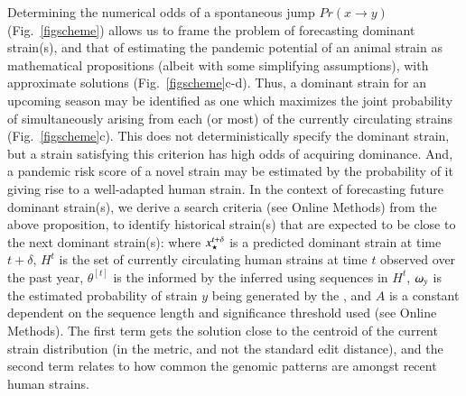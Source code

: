 \documentclass[onecolumn, compsoc,10pt]{IEEEtran}
\def\METHODS{Online Methods\xspace}
\begin{document}
Determining the numerical odds of a spontaneous jump $ Pr(x \rightarrow y)$ (Fig.~\ref{figscheme}) allows us to frame the problem of forecasting  dominant strain(s), and that of estimating the  pandemic potential of an animal strain as  mathematical propositions (albeit with some simplifying assumptions), with  approximate solutions (Fig.~\ref{figscheme}c-d). Thus,  a dominant strain for an upcoming  season may be identified as one which maximizes the joint probability of simultaneously arising from each (or most)  of the currently circulating strains (Fig.~\ref{figscheme}c).  This does not deterministically specify the dominant strain, but a strain satisfying this criterion  has  high odds of acquiring dominance. And, a pandemic risk score of a novel strain may be estimated by the probability of it giving rise to a well-adapted human strain. In the context of  forecasting  future dominant strain(s),  we derive a search criteria (see \METHODS) from the above proposition, to identify  historical strain(s) that are  expected to be close to the next dominant strain(s):
%
%
where $x_\star^{t+\delta}$ is a predicted dominant strain  at time $t+\delta$, $H^t$ is the set of currently circulating human strains at time $t$  observed over the past year, $\theta^{[t]}$ is the \qdist informed by the inferred \enet using sequences in $H^t$, $\omega_{y}$ is the estimated probability of strain $y$ being generated by the \enet, and $A$ is a constant dependent on the sequence length and significance threshold used (see \METHODS). The first term gets the solution close to the centroid of the current strain distribution (in the \qdist metric, and not the standard edit distance), and the second term relates to how common the genomic patterns are amongst recent human strains. 
\end{document}
